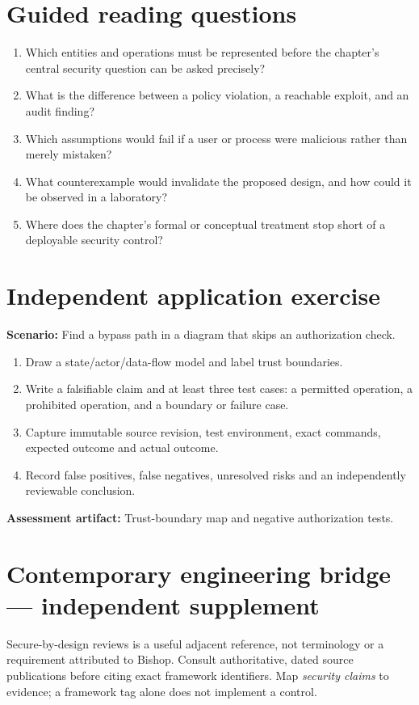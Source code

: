 \documentclass[10pt,letterpaper]{article}
\begin{document}
\section{Guided reading questions}
\begin{enumerate}
\item Which entities and operations must be represented before the chapter's central security question can be asked precisely?
\item What is the difference between a policy violation, a reachable exploit, and an audit finding?
\item Which assumptions would fail if a user or process were malicious rather than merely mistaken?
\item What counterexample would invalidate the proposed design, and how could it be observed in a laboratory?
\item Where does the chapter's formal or conceptual treatment stop short of a deployable security control?
\end{enumerate}
\section{Independent application exercise}
\textbf{Scenario:} Find a bypass path in a diagram that skips an authorization check.
\begin{enumerate}
\item Draw a state/actor/data-flow model and label trust boundaries.
\item Write a falsifiable claim and at least three test cases: a permitted operation, a prohibited operation, and a boundary or failure case.
\item Capture immutable source revision, test environment, exact commands, expected outcome and actual outcome.
\item Record false positives, false negatives, unresolved risks and an independently reviewable conclusion.
\end{enumerate}
\textbf{Assessment artifact:} Trust-boundary map and negative authorization tests.
\section{Contemporary engineering bridge --- independent supplement}
Secure-by-design reviews is a useful adjacent reference, not terminology or a requirement attributed to Bishop. Consult authoritative, dated source publications before citing exact framework identifiers. Map \emph{security claims} to evidence; a framework tag alone does not implement a control.
\end{document}
